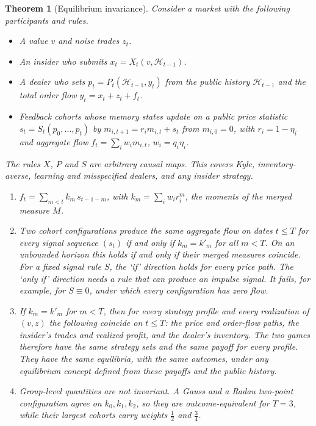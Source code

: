 \documentclass[12pt]{article}
\newtheorem{theorem}{Theorem}[section]
\theoremstyle{definition}
\theoremstyle{remark}
\begin{document}
\begin{theorem}[Equilibrium invariance]\label{thm:eqinv}
Consider a market with the following participants and rules.
\begin{itemize}[itemsep=1pt,topsep=2pt]
\item A value $v$ and noise trades $z_t$.
\item An insider who submits $x_t=X_t(v,\mathcal H_{t-1})$.
\item A dealer who sets $p_t=P_t(\mathcal H_{t-1},y_t)$ from the public history $\mathcal H_{t-1}$ and the total order flow $y_t=x_t+z_t+f_t$.
\item Feedback cohorts whose memory states update on a public price statistic $s_t=S_t(p_0,\ldots,p_t)$ by $m_{i,t+1}=r_im_{i,t}+s_t$ from $m_{i,0}=0$, with $r_i=1-\eta_i$ and aggregate flow $f_t=\sum_iw_im_{i,t}$, $w_i=q_i\eta_i$.
\end{itemize}
The rules $X$, $P$ and $S$ are arbitrary causal maps. This covers Kyle, inventory-averse, learning and misspecified dealers, and any insider strategy.
\begin{enumerate}[label=(\roman*),itemsep=1pt]
\item $f_t=\sum_{m<t}k_m\,s_{t-1-m}$, with $k_m=\sum_iw_ir_i^m$, the moments of the merged measure $M$.
\item Two cohort configurations produce the same aggregate flow on dates $t\le T$ for every signal sequence $(s_t)$ if and only if $k_m=k'_m$ for all $m<T$. On an unbounded horizon this holds if and only if their merged measures coincide. For a fixed signal rule $S$, the `if' direction holds for every price path. The `only if' direction needs a rule that can produce an impulse signal. It fails, for example, for $S\equiv0$, under which every configuration has zero flow.
\item If $k_m=k'_m$ for $m<T$, then for every strategy profile and every realization of $(v,z)$ the following coincide on $t\le T$: the price and order-flow paths, the insider's trades and realized profit, and the dealer's inventory. The two games therefore have the same strategy sets and the same payoff for every profile. They have the same equilibria, with the same outcomes, under any equilibrium concept defined from these payoffs and the public history.
\item Group-level quantities are not invariant. A Gauss and a Radau two-point configuration agree on $k_0,k_1,k_2$, so they are outcome-equivalent for $T=3$, while their largest cohorts carry weights $\tfrac12$ and $\tfrac34$.
\end{enumerate}
\end{theorem}
\end{document}
